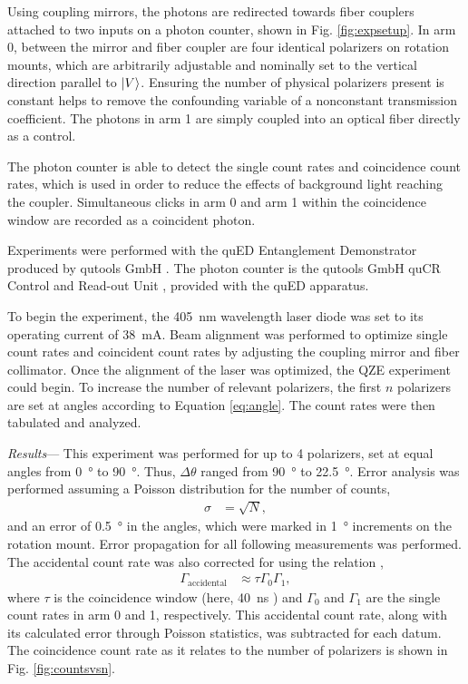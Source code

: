 \documentclass[%
reprint,
superscriptaddress,
nofootinbib,
nobibnotes,
nobalancelastpage,
amsmath,amssymb,
aps, 
prl,
floatfix,
]{revtex4-2}
\renewcommand{\section}[1]{\textit{#1}---\ignorespaces}
\begin{document}
Using coupling mirrors, the photons are redirected towards fiber couplers attached to two inputs on a photon counter, shown in Fig. \ref{fig:expsetup}. In arm 0, between the mirror and fiber coupler are four identical polarizers on rotation mounts, which are arbitrarily adjustable and nominally set to the vertical direction parallel to $\ket{V}$. Ensuring the number of physical polarizers present is constant helps to remove the confounding variable of a nonconstant transmission coefficient. The photons in arm 1 are simply coupled into an optical fiber directly as a control. 

The photon counter is able to detect the single count rates and coincidence count rates, which is used in order to reduce the effects of background light reaching the coupler. Simultaneous clicks in arm 0 and arm 1 within the coincidence window are recorded as a coincident photon.

Experiments were performed with the quED Entanglement Demonstrator produced by qutools GmbH \cite{qutoolsgmbhQutoolsQuEDDatasheet2022}. The photon counter is the qutools GmbH quCR Control and Read-out Unit \cite{qutoolsgmbhQuCRManualVersion2019}, provided with the quED apparatus. 

To begin the experiment, the \qty{405}{\nano\meter} wavelength laser diode was set to its operating current of \qty{38}{\milli\ampere}. Beam alignment was performed to optimize single count rates and coincident count rates by adjusting the coupling mirror and fiber collimator. Once the alignment of the laser was optimized, the QZE experiment could begin. To increase the number of relevant polarizers, the first $n$ polarizers are set at angles according to Equation \ref{eq:angle}. The count rates were then tabulated and analyzed.


\section{Results}
This experiment was performed for up to 4 polarizers, set at equal angles from \qty{0}{\degree} to \qty{90}{\degree}. Thus, $\Delta \theta$ ranged from \qty{90}{\degree} to \qty{22.5}{\degree}. Error analysis was performed assuming a Poisson distribution for the number of counts,
\begin{align}
    \sigma &= \sqrt{N}\nonumber,
\end{align}
and an error of \qty{0.5}{\degree} in the angles, which were marked in \qty{1}{\degree} increments on the rotation mount. Error propagation for all following measurements was performed. The accidental count rate was also corrected for using the relation \cite{schroedingerRateNfoldAccidental1944},
\begin{align}
    \Gamma_\text{accidental} &\approx \tau \Gamma_0 \Gamma_1,
\end{align}
where $\tau$ is the coincidence window (here, \qty{40}{\nano\second} \cite{qutoolsgmbhQutoolsQuEDDatasheet2022}) and $\Gamma_0$ and $\Gamma_1$ are the single count rates in arm 0 and 1, respectively. This accidental count rate, along with its calculated error through Poisson statistics, was subtracted for each datum. The coincidence count rate as it relates to the number of polarizers is shown in Fig. \ref{fig:countsvsn}.
\end{document}
